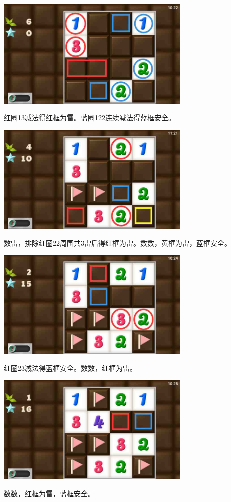 \subsection{} %
\begin{center}
    \includegraphics[width=0.7\textwidth]{puzzlelow/176-1.jpg}
\end{center}
红圈13减法得红框为雷。蓝圈122连续减法得蓝框安全。
\begin{center}
    \includegraphics[width=0.7\textwidth]{puzzlelow/176-2.jpg}
\end{center}
数雷，排除红圈22周围共3雷后得红框为雷。数数，黄框为雷，蓝框安全。
\begin{center}
    \includegraphics[width=0.7\textwidth]{puzzlelow/176-3.jpg}
\end{center}
红圈23减法得蓝框安全。数数，红框为雷。
\begin{center}
    \includegraphics[width=0.7\textwidth]{puzzlelow/176-4.jpg}
\end{center}
数数，红框为雷，蓝框安全。

